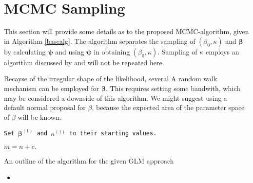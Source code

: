 \documentclass[12pt,a4paper]{article}\usepackage[]{graphicx}\usepackage[]{color}
\begin{document}
\section{MCMC Sampling}

This section will provide some details as to the proposed MCMC-algorithm, given in Algorithm \ref{basealg}. The algorithm separates the sampling of $(\beta_0, \kappa)$ and $\boldsymbol\beta$ by calculating $\boldsymbol\psi$ and using $\boldsymbol\psi$ in obtaining $(\beta_0, \kappa)$. Sampling of $\kappa$ employs an algorithm discussed by \citet{forbes2014fast} and will not be repeated here.

Becayse of the irregular shape of the likelihood, several
A random walk mechanism can be employed for $\boldsymbol\beta$. This requires setting some bandwith, which may be considered a downside of this algorithm. We might suggest using a default normal proposal for $\beta$, because the expected area of the parameter space of $\beta$ will be known.


\begin{algorithm}[H]


 \texttt{Set $\boldsymbol{\beta}^{(1)}$ and $\kappa^{(1)}$ to their starting values.}

  $m = n + c.$

 \caption{An outline of the algorithm for the given GLM approach}
 \label{basealg}
\end{algorithm}


\begin{itemize}
\item
\end{itemize}
\end{document}
